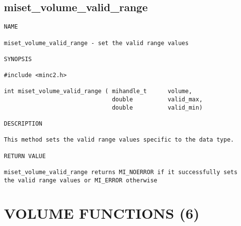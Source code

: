 \documentclass{article}
\begin{document}
\subsection{miset\_volume\_valid\_range}
\begin{verbatim}
NAME 

miset_volume_valid_range - set the valid range values

SYNOPSIS

#include <minc2.h>

int miset_volume_valid_range ( mihandle_t      volume,
                               double          valid_max,
                               double          valid_min)
                                
DESCRIPTION

This method sets the valid range values specific to the data type.

RETURN VALUE

miset_volume_valid_range returns MI_NOERROR if it successfully sets 
the valid range values or MI_ERROR otherwise
\end{verbatim}





                        
                                




\section{VOLUME FUNCTIONS (6)}
\end{document}
